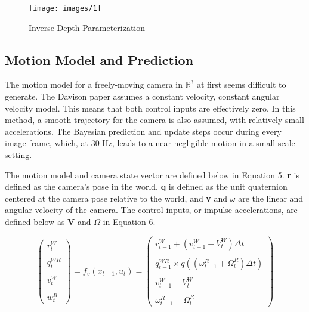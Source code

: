 \documentclass[conference]{IEEEtran}
\begin{document}
\begin{figure}[h]
\centering
\texttt{[image: images/1]}
\caption{Inverse Depth Parameterization}
\label{fig:depth}
\end{figure}

\subsection{Motion Model and Prediction}

The motion model for a freely-moving camera in $\mathbb{R}^3$ at first seems difficult to generate. The Davison paper \cite{davison2007monoslam} assumes a constant velocity, constant angular velocity model. This means that both control inputs are effectively zero. In this method, a smooth trajectory for the camera is also assumed, with relatively small accelerations. The Bayesian prediction and update steps occur during every image frame, which, at 30 Hz, leads to a near negligible motion in a small-scale setting.

The motion model and camera state vector are defined below in Equation 5. \textbf{r} is defined as the camera's pose in the world, \textbf{q} is defined as the unit quaternion centered at the camera pose relative to the world, and \textbf{v} and \textbf{$\omega$} are the linear and angular velocity of the camera. The control inputs, or impulse accelerations, are defined below as \textbf{V} and \textbf{$\Omega$} in Equation 6.

\begin{equation}
\begin{pmatrix}
r_{t}^{W} \\ \\
q_{t}^{WR} \\ \\
v_{t}^{W} \\ \\
w_{t}^{R}
\end{pmatrix} = f_{v}(x_{t-1},u_{t}) = 
\begin{pmatrix}
r_{t-1}^{W} + (v_{t-1}^{W} + V_{t}^{W})\Delta t \\ \\
q_{t-1}^{WR}\times q((\omega_{t-1}^{R} + \Omega_{t}^{R})\Delta t) \\ \\
v_{t-1}^{W} + V_{t}^{W} \\ \\
\omega_{t-1}^{R} + \Omega_{t}^{R}
\end{pmatrix}
\end{equation}
\end{document}

